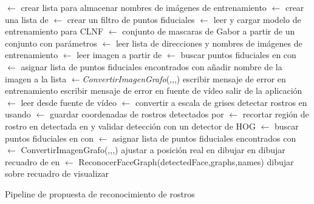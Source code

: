 \begin{algorithm}[]
\label{alg:Propuesta}
 $\gets$ crear lista para almacenar nombres de imágenes de entrenamiento\;
 $\gets$ crear una lista de \;
 $\gets$ crear un filtro de puntos fiduciales\;
 $\gets$ leer y cargar modelo de entrenamiento para \ac{CLNF}\;
 $\gets$ conjunto de mascaras de Gabor a partir de un conjunto con parámetros\;
 $\gets$ leer lista de direcciones y nombres de imágenes de entrenamiento\;
{
	 $\gets$ leer imagen a partir de \;
     $\gets$ buscar puntos fiduciales en  con \;
    {
    	 $\gets$ asignar lista de puntos fiduciales encontrados con \;
        añadir nombre de la imagen a la lista \;
        $\gets$\textit{ConvertirImagenGrafo}(,,,)\;
    }
    {
    	escribir mensaje de error en entrenamiento\;
    }
}
{
	escribir mensaje de error en fuente de vídeo\;
    salir de la aplicación\;
}
{
	 $\gets$ leer desde fuente de vídeo\;
     $\gets$ convertir  a escala de grises\;
    detectar rostros en  usando \;
     $\gets$ guardar coordenadas de rostros detectados por \;
    {
    	 $\gets$ recortar región de rostro en detectada en  y validar detección con un detector de \ac{HOG}\;
         $\gets$ buscar puntos fiduciales en  con \;
    }
    {
    	 $\gets$ asignar lista de puntos fiduciales encontrados con \;
         $\gets$ ConvertirImagenGrafo(,,,)\;
    }
    ajustar  a posición real en \;
    dibujar  en \;
    dibujar recuadro de  en \;
     $\gets$ ReconocerFaceGraph(detectedFace,graphs,names)\;
    dibujar  sobre recuadro de \;
    visualizar \;
}
\caption{Pipeline de propuesta de reconocimiento de rostros}
\end{algorithm}



